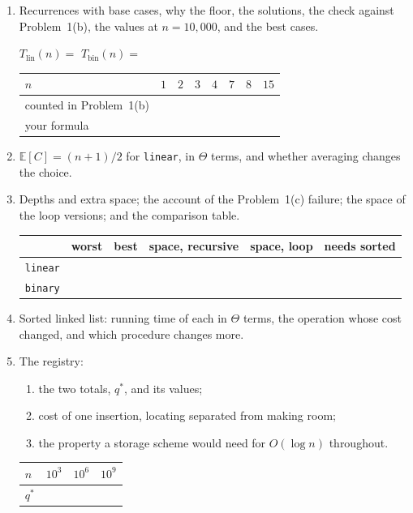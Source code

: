 \documentclass[11pt]{article}
\newenvironment{parts}{\begin{enumerate}[label=\textbf{(\alph*)}, leftmargin=*]}
                      {\end{enumerate}}
\begin{document}
\begin{parts}
  \item Recurrences with base cases, why the floor, the solutions, the check
    against Problem~1(b), the values at $n = 10{,}000$, and the best cases.

    $T_{\text{lin}}(n) = $ \qquad $T_{\text{bin}}(n) = $
    \begin{center}
    \begin{tabular}{lccccccc}
      \toprule
      $n$ & $1$ & $2$ & $3$ & $4$ & $7$ & $8$ & $15$ \\
      \midrule
      counted in Problem~1(b) & & & & & & & \\
      your formula & & & & & & & \\
      \bottomrule
    \end{tabular}
    \end{center}

  \item $\mathbb{E}[C] = (n+1)/2$ for \texttt{linear}, in $\Theta$ terms, and
    whether averaging changes the choice.

  \item Depths and extra space; the account of the Problem~1(c) failure; the
    space of the loop versions; and the comparison table.
    \begin{center}
    \begin{tabular}{lccccc}
      \toprule
      & worst & best & space, recursive & space, loop & needs sorted \\
      \midrule
      \texttt{linear} & & & & & \\
      \texttt{binary} & & & & & \\
      \bottomrule
    \end{tabular}
    \end{center}

  \item Sorted linked list: running time of each in $\Theta$ terms, the
    operation whose cost changed, and which procedure changes more.

  \item The registry:
    \begin{enumerate}[label=\textbf{(\roman*)}, leftmargin=*]
      \item the two totals, $q^\ast$, and its values;
      \item cost of one insertion, locating separated from making room;
      \item the property a storage scheme would need for $O(\log n)$ throughout.
    \end{enumerate}
    \begin{center}
    \begin{tabular}{lccc}
      \toprule
      $n$ & $10^3$ & $10^6$ & $10^9$ \\
      \midrule
      $q^\ast$ & & & \\
      \bottomrule
    \end{tabular}
    \end{center}
\end{parts}
\end{document}
